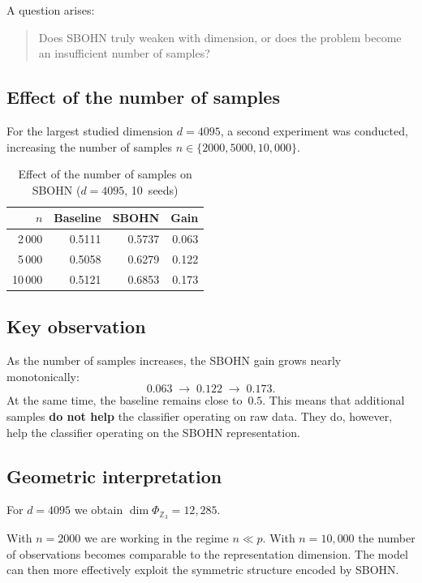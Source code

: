 \documentclass[11pt,a4paper]{report}
\begin{document}
A question arises:
\begin{quote}
Does SBOHN truly weaken with dimension, or does the problem become an insufficient number of samples?
\end{quote}


\subsection{Effect of the number of samples}

For the largest studied dimension $d = 4095$, a second experiment was conducted, increasing the number of samples $n \in \{2000, 5000, 10{,}000\}$.

\begin{table}[H]
\centering
\caption{Effect of the number of samples on SBOHN ($d=4095$, 10~seeds)}
\label{tab:scale_n}
\begin{tabular}{rrrr}
\toprule
$n$ & Baseline & SBOHN & Gain \\
\midrule
2\,000   & 0.5111 & 0.5737 & 0.063 \\
5\,000   & 0.5058 & 0.6279 & 0.122 \\
10\,000  & 0.5121 & 0.6853 & 0.173 \\
\bottomrule
\end{tabular}
\end{table}


\subsection{Key observation}

As the number of samples increases, the SBOHN gain grows nearly monotonically:
\[
0.063 \;\rightarrow\; 0.122 \;\rightarrow\; 0.173.
\]
At the same time, the baseline remains close to~$0.5$. This means that additional samples \textbf{do not help} the classifier operating on raw data. They do, however, help the classifier operating on the SBOHN representation.


\subsection{Geometric interpretation}

For $d = 4095$ we obtain $\dim \Phi_{\mathbb{Z}_3} = 12{,}285$.

With $n = 2000$ we are working in the regime $n \ll p$. With $n = 10{,}000$ the number of observations becomes comparable to the representation dimension. The model can then more effectively exploit the symmetric structure encoded by SBOHN.
\end{document}

